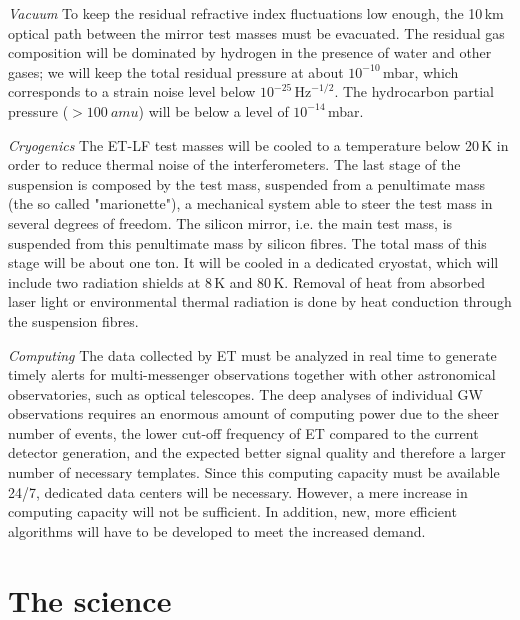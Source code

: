 \textit{Vacuum}\quad
To keep the residual refractive index fluctuations low enough, the 10\,km optical path between the mirror test masses must be evacuated. The residual gas composition will be dominated by hydrogen in the presence of water and other gases; we will keep the total residual pressure at about $10^{-10}$\,mbar, which corresponds to a strain noise level below $10^{-25}\, \mathrm{Hz}^{-1/2}$. The hydrocarbon partial pressure ($>100~amu$) will be below a level of $10^{-14}$\,mbar.

\textit{Cryogenics}\quad
The ET-LF test masses will be cooled to a temperature below 20\,K in order to
reduce thermal noise of the interferometers. 
The last stage of the suspension is composed by the test mass, suspended from a
penultimate mass (the so called "marionette"), a mechanical system able to
steer the test mass in several degrees of freedom. 
The silicon mirror, i.e. the main test mass,  is suspended from this penultimate
mass by silicon fibres. The total mass of this stage will be about one ton. It will be cooled in a dedicated cryostat, which will include two radiation shields at 8\,K and 80\,K. Removal of heat from absorbed laser light or environmental thermal radiation is done %
by heat conduction through the suspension fibres.

\textit{Computing}\quad
The data collected by ET must be analyzed in real time to generate timely alerts for multi-messenger observations together with other astronomical observatories, such as optical telescopes. 
The deep analyses of individual GW observations requires an enormous amount of computing power due to the sheer number of events, the lower cut-off frequency of ET compared to the current detector generation, and the expected better signal quality and therefore a larger number of necessary templates. Since this computing capacity must be available 24/7, dedicated data centers will be necessary. However, a mere increase in computing capacity will not be sufficient. In addition, new, more efficient algorithms will have to be developed to meet the increased demand. 

\section*{The science}
\label{sect:ScienceCaseKeyQuestions}

